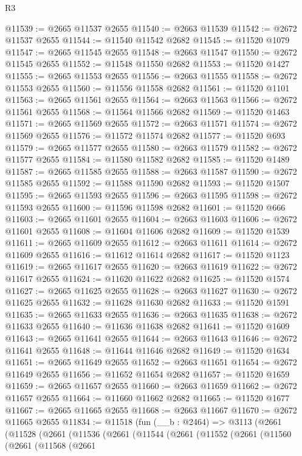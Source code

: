\begin{lexlean}{R3}
\begin{coremodule}
@11539 := @2665 @11537 @2655
@11540 := @2663 @11539
@11542 := @2672 @11537 @2655
@11544 := @11540 @11542 @2682
@11545 := @11520 @1079
@11547 := @2665 @11545 @2655
@11548 := @2663 @11547
@11550 := @2672 @11545 @2655
@11552 := @11548 @11550 @2682
@11553 := @11520 @1427
@11555 := @2665 @11553 @2655
@11556 := @2663 @11555
@11558 := @2672 @11553 @2655
@11560 := @11556 @11558 @2682
@11561 := @11520 @1101
@11563 := @2665 @11561 @2655
@11564 := @2663 @11563
@11566 := @2672 @11561 @2655
@11568 := @11564 @11566 @2682
@11569 := @11520 @1463
@11571 := @2665 @11569 @2655
@11572 := @2663 @11571
@11574 := @2672 @11569 @2655
@11576 := @11572 @11574 @2682
@11577 := @11520 @693
@11579 := @2665 @11577 @2655
@11580 := @2663 @11579
@11582 := @2672 @11577 @2655
@11584 := @11580 @11582 @2682
@11585 := @11520 @1489
@11587 := @2665 @11585 @2655
@11588 := @2663 @11587
@11590 := @2672 @11585 @2655
@11592 := @11588 @11590 @2682
@11593 := @11520 @1507
@11595 := @2665 @11593 @2655
@11596 := @2663 @11595
@11598 := @2672 @11593 @2655
@11600 := @11596 @11598 @2682
@11601 := @11520 @666
@11603 := @2665 @11601 @2655
@11604 := @2663 @11603
@11606 := @2672 @11601 @2655
@11608 := @11604 @11606 @2682
@11609 := @11520 @1539
@11611 := @2665 @11609 @2655
@11612 := @2663 @11611
@11614 := @2672 @11609 @2655
@11616 := @11612 @11614 @2682
@11617 := @11520 @1123
@11619 := @2665 @11617 @2655
@11620 := @2663 @11619
@11622 := @2672 @11617 @2655
@11624 := @11620 @11622 @2682
@11625 := @11520 @1574
@11627 := @2665 @11625 @2655
@11628 := @2663 @11627
@11630 := @2672 @11625 @2655
@11632 := @11628 @11630 @2682
@11633 := @11520 @1591
@11635 := @2665 @11633 @2655
@11636 := @2663 @11635
@11638 := @2672 @11633 @2655
@11640 := @11636 @11638 @2682
@11641 := @11520 @1609
@11643 := @2665 @11641 @2655
@11644 := @2663 @11643
@11646 := @2672 @11641 @2655
@11648 := @11644 @11646 @2682
@11649 := @11520 @1634
@11651 := @2665 @11649 @2655
@11652 := @2663 @11651
@11654 := @2672 @11649 @2655
@11656 := @11652 @11654 @2682
@11657 := @11520 @1659
@11659 := @2665 @11657 @2655
@11660 := @2663 @11659
@11662 := @2672 @11657 @2655
@11664 := @11660 @11662 @2682
@11665 := @11520 @1677
@11667 := @2665 @11665 @2655
@11668 := @2663 @11667
@11670 := @2672 @11665 @2655
@11834 := @11518
    (fun (__b : @2464) =>
    @3113
      (@2661
        (@11528
          (@2661
            (@11536
              (@2661
                (@11544
                  (@2661
                    (@11552
                      (@2661
                        (@11560
                          (@2661
                            (@11568
                              (@2661

\end{coremodule}
\end{lexlean}
